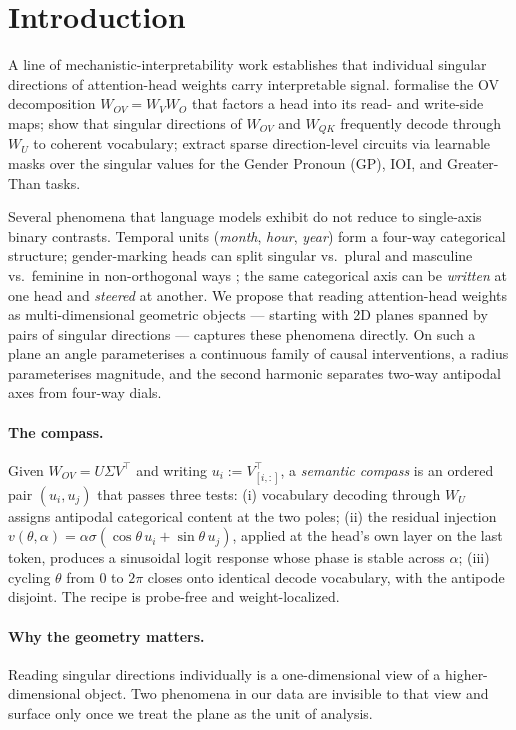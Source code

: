 \section{Introduction}
\label{sec:intro}

A line of mechanistic-interpretability work establishes that
individual singular directions of attention-head weights carry
interpretable signal. \citet{elhage2021mathematical} formalise the
OV decomposition $W_{OV} = W_V W_O$ that factors a head into its
read- and write-side maps; \citet{millidge2022svd} show that
singular directions of $W_{OV}$ and $W_{QK}$ frequently decode
through $W_U$ to coherent vocabulary; \citet{ahmad2025beyond}
extract sparse direction-level circuits via learnable masks over
the singular values for the Gender Pronoun (GP), IOI, and
Greater-Than tasks.

Several phenomena that language models exhibit do not reduce to
single-axis binary contrasts. Temporal units (\emph{month},
\emph{hour}, \emph{year}) form a four-way categorical structure;
gender-marking heads can split singular vs.\ plural and masculine
vs.\ feminine in non-orthogonal ways
\citep{engels2024not,park2024linearrep}; the same categorical axis
can be \emph{written} at one head and \emph{steered} at another.
We propose that reading attention-head weights as
multi-dimensional geometric objects --- starting with 2D planes
spanned by pairs of singular directions --- captures these
phenomena directly. On such a plane an angle parameterises a
continuous family of causal interventions, a radius parameterises
magnitude, and the second harmonic separates two-way antipodal
axes from four-way dials.

\paragraph{The compass.}
Given $W_{OV} = U \Sigma V^\top$ and writing $u_i := V^\top_{[i,:]}$,
a \emph{semantic compass} is an ordered pair $(u_i, u_j)$ that passes
three tests: (i) vocabulary decoding through $W_U$ assigns antipodal
categorical content at the two poles; (ii) the residual injection
$v(\theta, \alpha) = \alpha\sigma(\cos\theta\, u_i + \sin\theta\,
u_j)$, applied at the head's own layer on the last token, produces a
sinusoidal logit response whose phase is stable across $\alpha$;
(iii) cycling $\theta$ from $0$ to $2\pi$ closes onto identical decode
vocabulary, with the antipode disjoint. The recipe is probe-free and
weight-localized.

\paragraph{Why the geometry matters.}
Reading singular directions individually is a one-dimensional view
of a higher-dimensional object. Two phenomena in our data are
invisible to that view and surface only once we treat the plane as
the unit of analysis.


